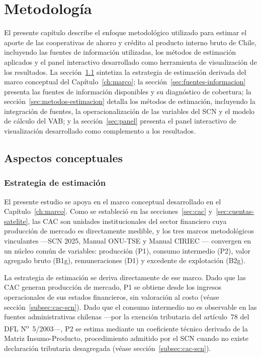 \chapter{Metodología}
\label{ch:metodologia}

El presente capítulo describe el enfoque metodológico utilizado para estimar 
el aporte de las cooperativas de ahorro y crédito al producto interno bruto 
de Chile, incluyendo las fuentes de información utilizadas, los métodos de 
estimación aplicados y el panel interactivo desarrollado como herramienta de 
visualización de los resultados. La sección~\ref{sec:aspectos-conceptuales} 
sintetiza la estrategia de estimación derivada del marco conceptual del 
Capítulo~\ref{ch:marco}; la sección~\ref{sec:fuentes-informacion} presenta las 
fuentes de información disponibles y su diagnóstico de cobertura; la 
sección~\ref{sec:metodos-estimacion} detalla los métodos de estimación, 
incluyendo la integración de fuentes, la operacionalización de las variables 
del SCN y el modelo de cálculo del VAB; y la sección~\ref{sec:panel} presenta 
el panel interactivo de visualización desarrollado como complemento a los 
resultados.

\section{Aspectos conceptuales}
\label{sec:aspectos-conceptuales}

\subsection{Estrategia de estimación}
\label{subsec:marco-referencia}

El presente estudio se apoya en el marco conceptual desarrollado en el 
Capítulo~\ref{ch:marco}. Como se estableció en las 
secciones~\ref{sec:cac} y~\ref{sec:cuentas-satelite}, las CAC son unidades 
institucionales del sector financiero cuya producción de mercado es 
directamente medible, y los tres marcos metodológicos vinculantes ---SCN 
2025, Manual ONU-TSE \cite{vereinte_nationen_satellite_2018} y Manual CIRIEC 
\cite{barea_tejeiro_manual_2007}--- convergen en un núcleo común de variables: 
producción (P1), consumo intermedio (P2), valor agregado bruto (B1g), 
remuneraciones (D1) y excedente de explotación (B2g).

La estrategia de estimación se deriva directamente de ese marco. Dado que 
las CAC generan producción de mercado, P1 se obtiene desde los ingresos 
operacionales de sus estados financieros, sin valoración al costo 
(véase sección~\ref{subsec:cac-scn}). Dado que el consumo intermedio no es 
observable en las fuentes administrativas chilenas ---por la exención 
tributaria del artículo~78 del DFL N\textsuperscript{o}~5/2003---, P2 se 
estima mediante un coeficiente técnico derivado de la Matriz Insumo-Producto, 
procedimiento admitido por el SCN cuando no existe declaración tributaria 
desagregada (véase sección~\ref{subsec:cac-scn}).

